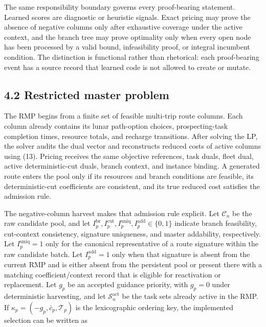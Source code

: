 \documentclass[
  11pt,
]{article}
\begin{document}
The same responsibility boundary governs every proof-bearing statement.
Learned scores are diagnostic or heuristic signals. Exact pricing may
prove the absence of negative columns only after exhaustive coverage
under the active context, and the branch tree may prove optimality only
when every open node has been processed by a valid bound, infeasibility
proof, or integral incumbent condition. The distinction is functional
rather than rhetorical: each proof-bearing event has a source record
that learned code is not allowed to create or mutate.

\hypertarget{restricted-master-problem}{%
\subsection{4.2 Restricted master
problem}\label{restricted-master-problem}}

The RMP begins from a finite set of feasible multi-trip route columns.
Each column already contains its lunar path-option choices,
prospecting-task completion times, resource totals, and recharge
transitions. After solving the LP, the solver audits the dual vector and
reconstructs reduced costs of active columns using (13). Pricing
receives the same objective references, task duals, fleet dual, active
deterministic-cut duals, branch context, and instance binding. A
generated route enters the pool only if its resources and branch
conditions are feasible, its deterministic-cut coefficients are
consistent, and its true reduced cost satisfies the admission rule.

The negative-column harvest makes that admission rule explicit. Let
\(\mathcal{C}_n\) be the raw candidate pool, and let
\(I_p^{\mathrm{br}},I_p^{\mathrm{cut}},I_p^{\mathrm{uniq}}, I_p^{\mathrm{add}}\in\{0,1\}\)
indicate branch feasibility, cut-context consistency, signature
uniqueness, and master addability, respectively. Let
\(I_p^{\mathrm{uniq}}=1\) only for the canonical representative of a
route signature within the raw candidate batch. Let
\(I_p^{\mathrm{add}}=1\) only when that signature is absent from the
current RMP and is either absent from the persistent pool or present
there with a matching coefficient/context record that is eligible for
reactivation or replacement. Let \(g_p\) be an accepted guidance
priority, with \(g_p=0\) under deterministic harvesting, and let
\(\mathcal{S}_n^{\mathrm{act}}\) be the task sets already active in the
RMP. If \(\kappa_p=(-g_p,\bar c_p,\mathcal{T}_p)\) is the lexicographic
ordering key, the implemented selection can be written as
\end{document}

